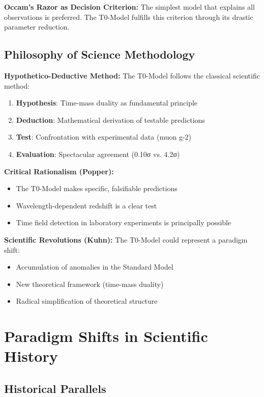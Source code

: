 \documentclass[12pt,a4paper]{report}
\begin{document}
\textbf{Occam's Razor as Decision Criterion:}
The simplest model that explains all observations is preferred. The T0-Model fulfills this criterion through its drastic parameter reduction.

\subsection{Philosophy of Science Methodology}\label{subsec:philosophy_science_methodology}

\textbf{Hypothetico-Deductive Method:}
The T0-Model follows the classical scientific method:
\begin{enumerate}
	\item \textbf{Hypothesis}: Time-mass duality as fundamental principle
	\item \textbf{Deduction}: Mathematical derivation of testable predictions
	\item \textbf{Test}: Confrontation with experimental data (muon g-2)
	\item \textbf{Evaluation}: Spectacular agreement (0.10σ vs. 4.2σ)
\end{enumerate}

\textbf{Critical Rationalism (Popper):}
\begin{itemize}
	\item The T0-Model makes specific, falsifiable predictions
	\item Wavelength-dependent redshift is a clear test
	\item Time field detection in laboratory experiments is principally possible
\end{itemize}

\textbf{Scientific Revolutions (Kuhn):}
The T0-Model could represent a paradigm shift:
\begin{itemize}
	\item Accumulation of anomalies in the Standard Model
	\item New theoretical framework (time-mass duality)
	\item Radical simplification of theoretical structure
\end{itemize}

	\section{Paradigm Shifts in Scientific History}\label{sec:paradigm_shifts}

\subsection{Historical Parallels}\label{subsec:historical_parallels}
\end{document}
